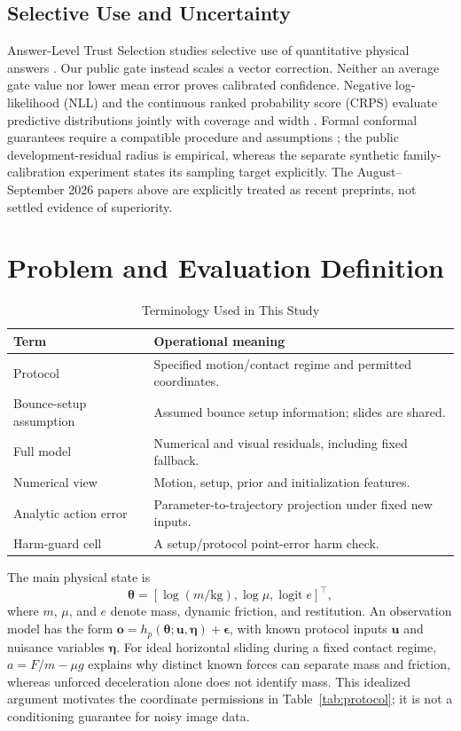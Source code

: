 \documentclass{ieeeaccess}
\begin{document}
\subsection{Selective Use and Uncertainty}
Answer-Level Trust Selection studies selective use of quantitative physical answers \cite{yu2026ats}. Our public gate instead scales a vector correction. Neither an average gate value nor lower mean error proves calibrated confidence. Negative log-likelihood (NLL) and the continuous ranked probability score (CRPS) evaluate predictive distributions jointly with coverage and width \cite{gneiting2007proper}. Formal conformal guarantees require a compatible procedure and assumptions \cite{angelopoulos2023conformal}; the public development-residual radius is empirical, whereas the separate synthetic family-calibration experiment states its sampling target explicitly. The August--September 2026 papers above are explicitly treated as recent preprints, not settled evidence of superiority.

\section{Problem and Evaluation Definition}\label{sec:problem}
\begin{table}[htbp]\centering\small
\caption{Terminology Used in This Study}\label{tab:terms}
\begin{tabular}{p{}p{}}\toprule
Term & Operational meaning\\\midrule
Protocol & Specified motion/contact regime and permitted coordinates.\\
Bounce-setup assumption & Assumed bounce setup information; slides are shared.\\
Full model & Numerical and visual residuals, including fixed fallback.\\
Numerical view & Motion, setup, prior and initialization features.\\
Analytic action error & Parameter-to-trajectory projection under fixed new inputs.\\
Harm-guard cell & A setup/protocol point-error harm check.\\
\bottomrule\end{tabular}
\end{table}

The main physical state is
\begin{equation}
\bm\theta=[\log(m/\mathrm{kg}),\log\mu,\operatorname{logit}e]^\top,
\end{equation}
where $m$, $\mu$, and $e$ denote mass, dynamic friction, and restitution. An observation model has the form $\bm o=h_p(\bm\theta;\bm u,\bm\eta)+\bm\epsilon$, with known protocol inputs $\bm u$ and nuisance variables $\bm\eta$. For ideal horizontal sliding during a fixed contact regime, $a=F/m-\mu g$ explains why distinct known forces can separate mass and friction, whereas unforced deceleration alone does not identify mass. This idealized argument motivates the coordinate permissions in Table~\ref{tab:protocol}; it is not a conditioning guarantee for noisy image data.
\end{document}
